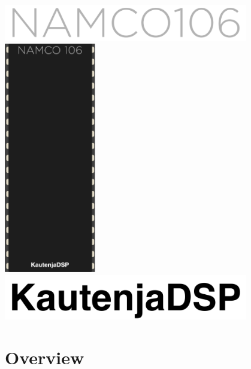 \documentclass[12pt,a4paper]{article}
\begin{document}

\thispagestyle{empty}
\vspace*{\fill}
\begin{center}
\includegraphics[width=0.8\textwidth]{Namco106-Logo}
\linebreak\linebreak\linebreak\linebreak
\includegraphics[width=0.3\textwidth]{Namco106-Module}
\linebreak\linebreak\linebreak\linebreak
\includegraphics[width=0.8\textwidth]{KautenjaDSP}
\end{center}
\vspace*{\fill}
\clearpage


\section{Overview}
\end{document}
